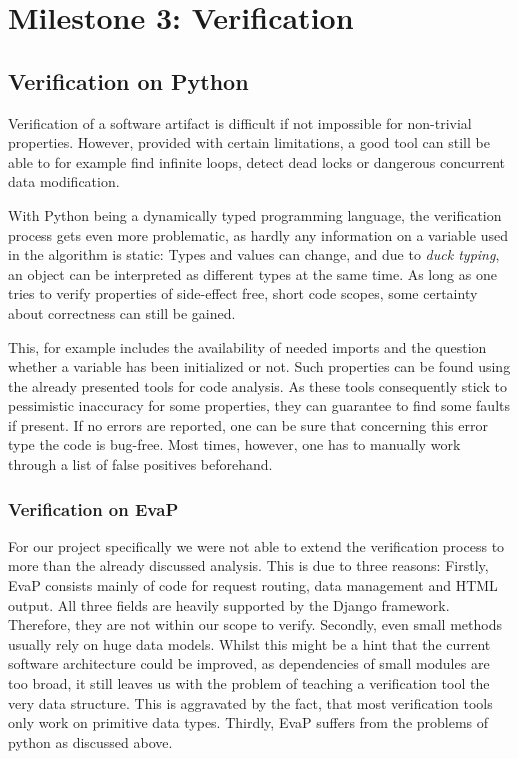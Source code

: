 \section{Milestone 3: Verification}

\subsection{Verification on Python}

Verification of a software artifact is difficult if not impossible for non-trivial properties.
However, provided with certain limitations, a good tool can still be able to for example find infinite loops, detect dead locks or dangerous concurrent data modification.

With Python being a dynamically typed programming language, the verification process gets even more problematic, as hardly any information on a variable used in the algorithm is static:
Types and values can change, and due to \textit{duck typing}, an object can be interpreted as different types at the same time.
As long as one tries to verify properties of side-effect free, short code scopes, some certainty about correctness can still be gained.

This, for example includes the availability of needed imports and the question whether a variable has been initialized or not.
Such properties can be found using the already presented tools for code analysis.
As these tools consequently stick to pessimistic inaccuracy for some properties, they can guarantee to find some faults if present.
If no errors are reported, one can be sure that concerning this error type the code is bug-free.
Most times, however, one has to manually work through a list of false positives beforehand.

\subsubsection{Verification on EvaP}

For our project specifically we were not able to extend the verification process to more than the already discussed analysis.
This is due to three reasons:
Firstly, EvaP consists mainly of code for request routing, data management and HTML output.
All three fields are heavily supported by the Django framework. Therefore, they are not within our scope to verify.
Secondly, even small methods usually rely on huge data models.
Whilst this might be a hint that the current software architecture could be improved, as dependencies of small modules are too broad, it still leaves us with the problem of teaching a verification tool the very data structure.
This is aggravated by the fact, that most verification tools only work on primitive data types.
Thirdly, EvaP suffers from the problems of python as discussed above.


